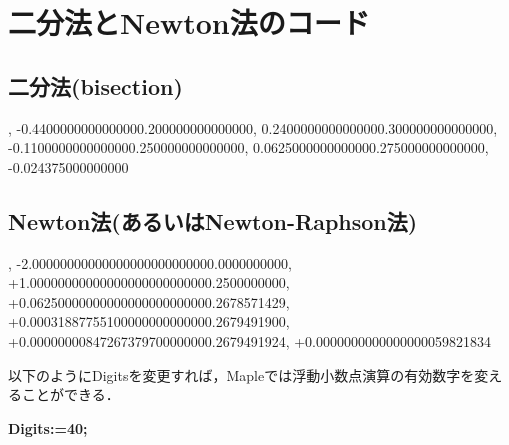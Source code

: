 \documentclass{article}
\begin{document}
\section{\textbf{二分法とNewton法のコード}}
\subsection{\textbf{二分法(bisection)}}
\begin{maplegroup}
\begin{mapleinput}
\end{mapleinput}
,   -0.4400000000000000.200000000000000,    0.2400000000000000.300000000000000,   -0.1100000000000000.250000000000000,    0.0625000000000000.275000000000000,   -0.024375000000000
\end{maplegroup}
\subsection{\textbf{Newton法(あるいはNewton-Raphson法)}}
\begin{maplegroup}
\begin{mapleinput}
\end{mapleinput}
\mapleresult
\begin{maplelatex}
\end{maplelatex}
\end{maplegroup}
\begin{maplegroup}
\begin{mapleinput}
\end{mapleinput}
, -2.00000000000000000000000000.0000000000, +1.00000000000000000000000000.2500000000, +0.06250000000000000000000000.2678571429, +0.00031887755100000000000000.2679491900, +0.00000000847267379700000000.2679491924, +0.0000000000000000059821834
\end{maplegroup}
\begin{maplegroup}
\begin{Maple Normal}{
以下のようにDigitsを変更すれば，Mapleでは浮動小数点演算の有効数字を変えることができる．}\end{Maple Normal}

\textbf{Digits:=40;}\mapleresult
\begin{maplelatex}
\end{maplelatex}
\end{maplegroup}
\end{document}

